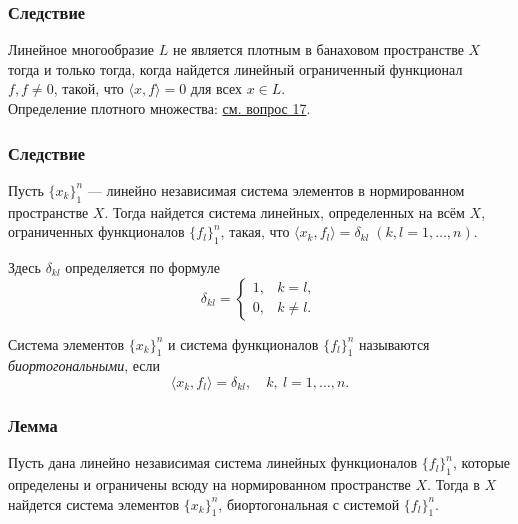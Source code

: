 \subsubsection*{Следствие}
Линейное многообразие $L$ не является плотным в банаховом пространстве $X$ тогда и только тогда, когда найдется линейный ограниченный функционал $f, f \neq 0$, такой, что $\langle x, f \rangle = 0$ для всех $x \in L$\cite[с.~168]{trenogin}.\\
Определение плотного множества: \hyperref[sec:q-17]{см. вопрос 17}.

\subsubsection*{Следствие}
Пусть $\{x_k\}^n_1$ --- линейно независимая система элементов в нормированном пространстве $X$. Тогда найдется система линейных, определенных на всём $X$, ограниченных функционалов $\{f_l\}^n_1$, такая, что $\langle x_k, f_l \rangle = \delta_{kl}\; (k,l = 1, \dots, n)$.

Здесь $\delta_{kl}$ определяется по формуле
$$\delta_{kl} =
\begin{cases}
	1,&k=l,\\
	0,&k\neq l.
\end{cases}$$

Система элементов $\{x_k\}^n_1$ и система функционалов $\{f_l\}^n_1$ называются \textit{биортогональными}, если
$$\langle x_k, f_l \rangle = \delta_{kl}, \quad k,\:l = 1, \dots, n.$$

\subsubsection*{Лемма}
Пусть дана линейно независимая система линейных функционалов $\{f_l\}^n_1$, которые определены и ограничены всюду на нормированном пространстве $X$. Тогда в $X$ найдется система элементов $\{x_k\}^n_1$, биортогональная с системой $\{f_l\}^n_1$\cite[с.~168]{trenogin}.